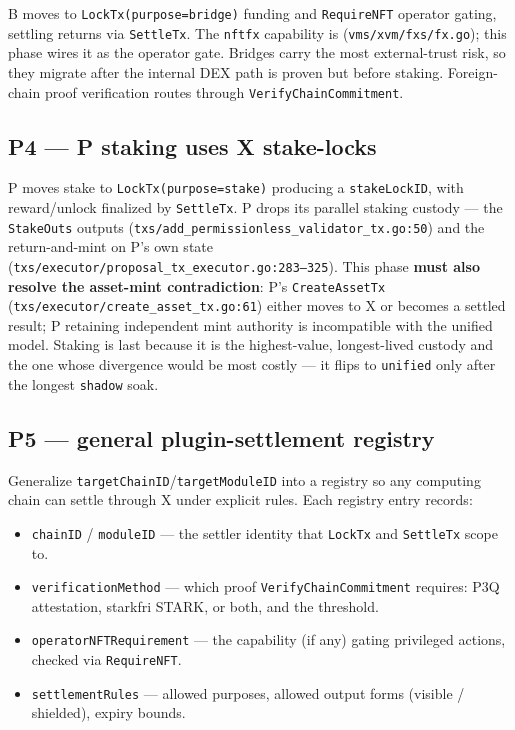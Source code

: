 B moves to \texttt{LockTx(purpose=bridge)} funding and
\texttt{RequireNFT} operator gating, settling returns via
\texttt{SettleTx}. The \texttt{nftfx} capability is \IMPL{}
(\texttt{vms/xvm/fxs/fx.go}); this phase wires it as the operator gate.
Bridges carry the most external-trust risk, so they migrate after the
internal DEX path is proven but before staking. Foreign-chain proof
verification routes through \texttt{VerifyChainCommitment}.

\subsection*{P4 --- P staking uses X stake-locks}

P moves stake to \texttt{LockTx(purpose=stake)} producing a
\texttt{stakeLockID}, with reward/unlock finalized by
\texttt{SettleTx}. P drops its parallel staking custody --- the
\texttt{StakeOuts} outputs
(\texttt{txs/add\_permissionless\_validator\_tx.go:50}) and the
return-and-mint on P's own state
(\texttt{txs/executor/proposal\_tx\_executor.go:283--325}). This phase
\textbf{must also resolve the asset-mint contradiction}: P's
\texttt{CreateAssetTx} (\texttt{txs/executor/create\_asset\_tx.go:61})
either moves to X or becomes a settled result; P retaining independent
mint authority is incompatible with the unified model. Staking is last
because it is the highest-value, longest-lived custody and the one whose
divergence would be most costly --- it flips to \texttt{unified} only
after the longest \texttt{shadow} soak.

\subsection*{P5 --- general plugin-settlement registry}

Generalize \texttt{targetChainID}/\texttt{targetModuleID} into a
registry so any computing chain can settle through X under explicit
rules. Each registry entry records:

\begin{itemize}[leftmargin=2em,nosep]
\item \texttt{chainID} / \texttt{moduleID} --- the settler identity that
  \texttt{LockTx} and \texttt{SettleTx} scope to.
\item \texttt{verificationMethod} --- which proof
  \texttt{VerifyChainCommitment} requires: P3Q attestation, starkfri
  STARK, or both, and the threshold.
\item \texttt{operatorNFTRequirement} --- the capability (if any) gating
  privileged actions, checked via \texttt{RequireNFT}.
\item \texttt{settlementRules} --- allowed purposes, allowed output
  forms (visible / shielded), expiry bounds.
\end{itemize}

